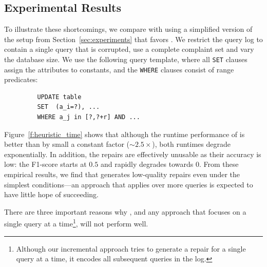 \subsection{Experimental Results}

To illustrate these shortcomings, we compare \dt with \sys using a simplified version of the setup from Section~\ref{sec:experiments} that favors \dt.
We restrict the query log to contain a single query that is corrupted, use a complete complaint set  and vary the database size.
We use the following query template, where all \texttt{SET} clauses assign the attributes to constants,
and the \texttt{WHERE} clauses consist of range predicates:

{\small
\begin{verbatim}
         UPDATE table
         SET  (a_i=?), ...
         WHERE a_j in [?,?+r] AND ...
\end{verbatim}
}

Figure~\ref{f:heuristic_time} shows that although the runtime performance of \dt is better than \sys by small a constant factor ($\sim 2.5 \times$),
both runtimes degrade exponentially.
In addition, the \dt repairs are effectively unusable as their accuracy is low: the F1-score starts at $0.5$ and rapidly degrades towards $0$.
From these empirical results, we find that \dt generates low-quality repairs even under the simplest conditions---an approach
that applies \dt over more queries is expected to have little hope of succeeding.



There are three important reasons why \dt, and any approach that focuses on a single query at a 
time\footnote{Although our incremental approach tries to generate a repair for a single query at a time, it encodes all subsequent queries in the log.}, will not perform well.

